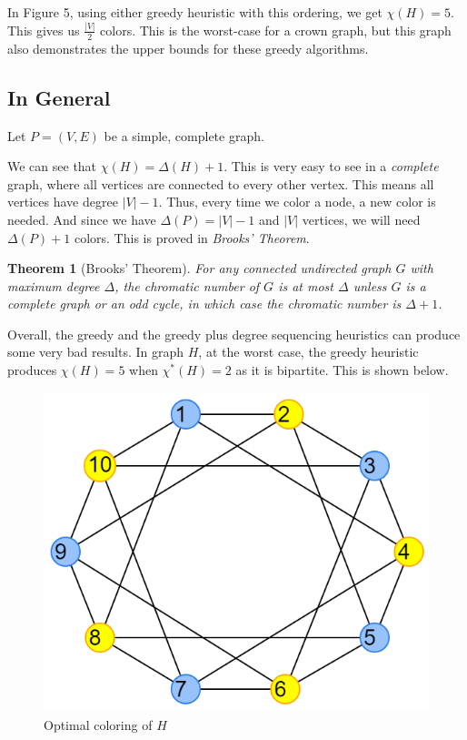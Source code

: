 \documentclass{article}
\newtheorem*{theorem}{Theorem}
\begin{document}
\newpage

In Figure 5, using either greedy heuristic with this ordering, we get \(\chi(H) = 5\). This gives us \(\frac{|V|}{2}\) colors. This is the worst-case for a crown graph, but this graph also demonstrates the upper bounds for these greedy algorithms. \newline

\subsection*{In General}

Let \(P = (V, E)\) be a simple, complete graph. \newline

We can see that \(\chi(H) = \Delta(H) + 1\). This is very easy to see in a \emph{complete} graph, where all vertices are connected to every other vertex. This means all vertices have degree \(|V| - 1\). Thus, every time we color a node, a new color is needed. And since we have \(\Delta(P) = |V| - 1\) and \(|V|\) vertices, we will need \(\Delta(P) + 1\) colors. This is proved in \emph{Brooks' Theorem}.

\begin{theorem}[Brooks' Theorem]
For any connected undirected graph \(G\) with maximum degree \(\Delta\), the chromatic number of \(G\) is at most \(\Delta\) unless \(G\) is a complete graph or an odd cycle, in which case the chromatic number is \(\Delta + 1\).
\end{theorem}

Overall, the greedy and the greedy plus degree sequencing heuristics can produce some very bad results. In graph \(H\), at the worst case, the greedy heuristic produces \(\chi(H) = 5\) when \(\chi^{*}(H) = 2\) as it is bipartite. This is shown below.

\begin{figure}[H]
\centering
\includegraphics[scale=0.40]{graph-6.png}
\caption{Optimal coloring of \(H\)}
\end{figure}
\end{document}
